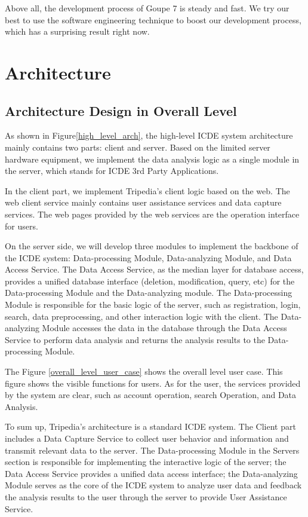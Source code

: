 \documentclass[conference]{IEEEtran}
\begin{document}
Above all, the development process of Goupe 7 is steady and fast. We try our best to use the software engineering technique to boost our development process, which has a surprising result right now.


\section{\textbf{Architecture}}


\subsection{\textbf{Architecture Design in Overall Level}}

As shown in Figure\ref{high_level_arch}, the high-level ICDE system architecture mainly contains two parts: client and server. Based on the limited server hardware equipment, we implement the data analysis logic as a single module in the server, which stands for ICDE 3rd Party Applications. 

In the client part, we implement Tripedia's client logic based on the web. The web client service mainly contains user assistance services and data capture services. The web pages provided by the web services are the operation interface for users.

On the server side, we will develop three modules to implement the backbone of the ICDE system: Data-processing Module, Data-analyzing Module, and Data Access Service. The Data Access Service, as the median layer for database access, provides a unified database interface (deletion, modification, query, etc) for the Data-processing Module and the Data-analyzing module. The Data-processing Module is responsible for the basic logic of the server, such as registration, login, search, data preprocessing, and other interaction logic with the client. The Data-analyzing Module accesses the data in the database through the Data Access Service to perform data analysis and returns the analysis results to the Data-processing Module.

The Figure \ref{overall_level_user_case} shows the overall level user case. This figure shows the visible functions for users. As for the user, the services provided by the system are clear, such as account operation, search Operation, and Data Analysis.

To sum up, Tripedia's architecture is a standard ICDE system. The Client part includes a Data Capture Service to collect user behavior and information and transmit relevant data to the server. The Data-processing Module in the Servers section is responsible for implementing the interactive logic of the server; the Data Access Service provides a unified data access interface; the Data-analyzing Module serves as the core of the ICDE system to analyze user data and feedback the analysis results to the user through the server to provide User Assistance Service.
\end{document}
